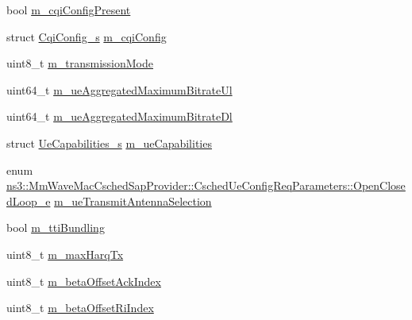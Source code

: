 \begin{DoxyCompactItemize}
\item 
bool \hyperlink{structns3_1_1MmWaveMacCschedSapProvider_1_1CschedUeConfigReqParameters_a28ec114157f9570b42a460d96eb36298}{m\+\_\+cqi\+Config\+Present}
\item 
struct \hyperlink{structns3_1_1CqiConfig__s}{Cqi\+Config\+\_\+s} \hyperlink{structns3_1_1MmWaveMacCschedSapProvider_1_1CschedUeConfigReqParameters_a6f3d2fd54701d618f67dd784a00977ee}{m\+\_\+cqi\+Config}
\item 
uint8\+\_\+t \hyperlink{structns3_1_1MmWaveMacCschedSapProvider_1_1CschedUeConfigReqParameters_a7294cebf493fac03c45d21482a236cf7}{m\+\_\+transmission\+Mode}
\item 
uint64\+\_\+t \hyperlink{structns3_1_1MmWaveMacCschedSapProvider_1_1CschedUeConfigReqParameters_ae15dc16e070831711db1f8f8383a8593}{m\+\_\+ue\+Aggregated\+Maximum\+Bitrate\+Ul}
\item 
uint64\+\_\+t \hyperlink{structns3_1_1MmWaveMacCschedSapProvider_1_1CschedUeConfigReqParameters_aa5efecb1f1bfb3e2dcd6be6557ead9e3}{m\+\_\+ue\+Aggregated\+Maximum\+Bitrate\+Dl}
\item 
struct \hyperlink{structns3_1_1UeCapabilities__s}{Ue\+Capabilities\+\_\+s} \hyperlink{structns3_1_1MmWaveMacCschedSapProvider_1_1CschedUeConfigReqParameters_a633078f83d1dd6f823befbe84f1b2281}{m\+\_\+ue\+Capabilities}
\item 
enum \hyperlink{structns3_1_1MmWaveMacCschedSapProvider_1_1CschedUeConfigReqParameters_a3f04acb30eed1c23a8375ccd6164a875}{ns3\+::\+Mm\+Wave\+Mac\+Csched\+Sap\+Provider\+::\+Csched\+Ue\+Config\+Req\+Parameters\+::\+Open\+Closed\+Loop\+\_\+e} \hyperlink{structns3_1_1MmWaveMacCschedSapProvider_1_1CschedUeConfigReqParameters_ac629576e51001a37084857d66b186757}{m\+\_\+ue\+Transmit\+Antenna\+Selection}
\item 
bool \hyperlink{structns3_1_1MmWaveMacCschedSapProvider_1_1CschedUeConfigReqParameters_a9dd2863921f2c1789c05c937979abfc8}{m\+\_\+tti\+Bundling}
\item 
uint8\+\_\+t \hyperlink{structns3_1_1MmWaveMacCschedSapProvider_1_1CschedUeConfigReqParameters_acfeb71e197b790d3334444593abfdc68}{m\+\_\+max\+Harq\+Tx}
\item 
uint8\+\_\+t \hyperlink{structns3_1_1MmWaveMacCschedSapProvider_1_1CschedUeConfigReqParameters_a8becc782891e7323dffd994422c6fb87}{m\+\_\+beta\+Offset\+Ack\+Index}
\item 
uint8\+\_\+t \hyperlink{structns3_1_1MmWaveMacCschedSapProvider_1_1CschedUeConfigReqParameters_ad07d0e33d08979b8a9061f31cc55884b}{m\+\_\+beta\+Offset\+Ri\+Index}

\end{DoxyCompactItemize}
